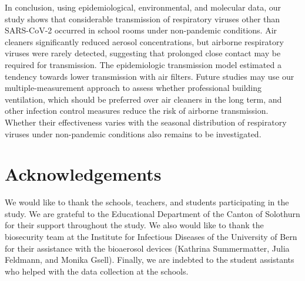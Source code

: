 \documentclass[fleqn,11pt]{wlscirep}
\begin{document}
In conclusion, using epidemiological, environmental, and molecular data, our study shows that considerable transmission of respiratory viruses other than SARS-CoV-2 occurred in school rooms under non-pandemic conditions. Air cleaners significantly reduced aerosol concentrations, but airborne respiratory viruses were rarely detected, suggesting that prolonged close contact may be required for transmission. The epidemiologic transmission model estimated a tendency towards lower transmission with air filters. Future studies may use our multiple-measurement approach to assess whether professional building ventilation, which should be preferred over air cleaners in the long term, and other infection control measures reduce the risk of airborne transmission. Whether their effectiveness varies with the seasonal distribution of respiratory viruses under non-pandemic conditions also remains to be investigated. 


\newpage


\section*{Acknowledgements}
We would like to thank the schools, teachers, and students participating in the study. We are grateful to the Educational Department of the Canton of Solothurn for their support throughout the study. We also would like to thank the biosecurity team at the Institute for Infectious Diseases of the University of Bern for their assistance with the bioaerosol devices (Kathrina Summermatter, Julia Feldmann, and Monika Gsell). Finally, we are indebted to the student assistants who helped with the data collection at the schools.


\end{document}
